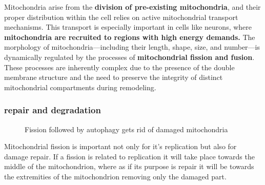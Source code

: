 \documentclass[../main.tex]{subfiles}
\begin{document}
Mitochondria arise from the\textbf{ division of pre-existing mitochondria}, and their proper distribution within the cell relies on active mitochondrial transport mechanisms. This transport is especially important in cells like neurons, where \textbf{mitochondria are recruited to regions with high energy demands.} The morphology of mitochondria—including their length, shape, size, and number—is dynamically regulated by the processes of \textbf{mitochondrial fission and fusion}. These processes are inherently complex due to the presence of the double membrane structure and the need to preserve the integrity of distinct mitochondrial compartments during remodeling. 
\subsubsection{repair and degradation}
\begin{figure}[H]
	\centering
	\caption{Fission followed by autophagy gets rid of damaged mitochondria}
\end{figure}
Mitochondrial fission is important not only for it's replication but also for damage repair. If a fission is related to replication it will take place towards the middle of the mitochondrion, where as if its purpose is repair it will be towards the extremities of the mitochondrion removing only the damaged part.
\end{document}
